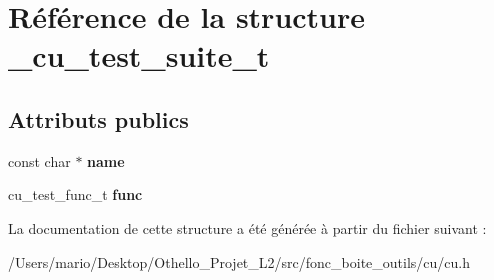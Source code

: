 \hypertarget{struct__cu__test__suite__t}{}\section{Référence de la structure \+\_\+cu\+\_\+test\+\_\+suite\+\_\+t}
\label{struct__cu__test__suite__t}
\subsection*{Attributs publics}
\begin{DoxyCompactItemize}
\item 
\mbox{\label{struct__cu__test__suite__t_abd2eaab22b742b7eabf1c06c4b02ea7a}} 
const char $\ast$ {\bfseries name}
\item 
\mbox{\label{struct__cu__test__suite__t_af364f5e0e18f5c23a0e5d730775bac7a}} 
cu\+\_\+test\+\_\+func\+\_\+t {\bfseries func}
\end{DoxyCompactItemize}


La documentation de cette structure a été générée à partir du fichier suivant \+:\begin{DoxyCompactItemize}
\item 
/\+Users/mario/\+Desktop/\+Othello\+\_\+\+Projet\+\_\+\+L2/src/fonc\+\_\+boite\+\_\+outils/cu/cu.\+h\end{DoxyCompactItemize}
